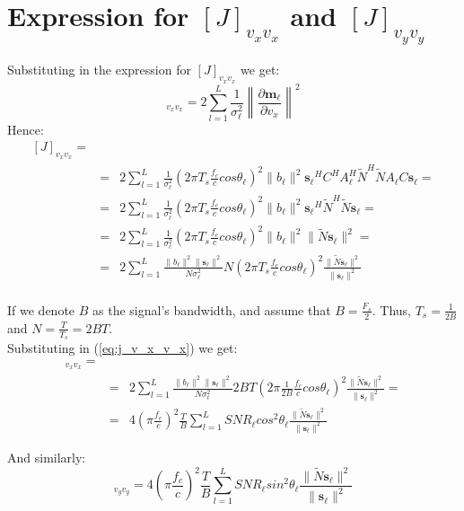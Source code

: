 \section{Expression for $[J]_{v_x v_x}$ and $[J]_{v_y v_y}$ }


Substituting in the expression for $[J]_{v_x v_x}$ we get:
\begin{equation}
[J]_{v_x v_x} = 2\sum_{l=1}^{L}\frac{1}{\sigma_\ell ^2}\left\|\frac{\partial \mathbf{m_\ell }}{\partial v_x}\right\|^2
\end{equation}
Hence:
\begin{eqnarray}
\label{eq:j_v_x_v_x}
[J]_{v_x v_x} = \\
&=& 2\sum_{l=1}^{L}\frac{1}{\sigma_\ell ^2}(2 \pi T_s \frac{f_c}{c}cos\theta_\ell )^2 \|b_\ell \|^2 \mathbf{s_\ell }^H C^H A_\ell ^H \tilde{N}^H  \tilde{N} A_\ell  C \mathbf{s_\ell } = \nonumber \\
&=& 2\sum_{l=1}^{L}\frac{1}{\sigma_\ell ^2}(2 \pi T_s \frac{f_c}{c}cos\theta_\ell )^2 \|b_\ell \|^2 \mathbf{s_\ell }^H \tilde{N}^H  \tilde{N} \mathbf{s_\ell } = \nonumber \\
&=& 2\sum_{l=1}^{L}\frac{1}{\sigma_\ell ^2}(2 \pi T_s \frac{f_c}{c}cos\theta_\ell )^2 \|b_\ell \|^2  \|\tilde{N} \mathbf{s_\ell }\|^2 = \nonumber \\
&=& 2\sum_{l=1}^{L}\frac{\|b_\ell \|^2 \|\mathbf{s_\ell }\|^2}{N \sigma_\ell ^2}N(2 \pi T_s \frac{f_c}{c}cos\theta_\ell )^2  \frac{\|\tilde{N} \mathbf{s_\ell }\|^2}{\|\mathbf{s_\ell }\|^2} \nonumber \\
\end{eqnarray}

If we denote $B$ as the signal's bandwidth, and assume that $B = \frac{F_s}{2}$.
Thus, $T_s = \frac{1}{2B}$ and $N=\frac{T}{T_s}=2BT$.\\
Substituting in (\ref{eq:j_v_x_v_x}) we get:
\begin{eqnarray}
[J]_{v_x v_x} = \\
&=& 2\sum_{l=1}^{L}\frac{\|b_\ell \|^2 \|\mathbf{s_\ell }\|^2}{N \sigma_\ell ^2} 2BT(2 \pi \frac{1}{2B} \frac{f_c}{c}cos\theta_\ell )^2 \frac{\|\tilde{N} \mathbf{s_\ell }\|^2}{\|\mathbf{s_\ell }\|^2} = \nonumber \\
&=&4 \left(\pi \frac{f_c}{c}\right)^2 \frac{T}{B}  \sum_{l=1}^{L}SNR_\ell  cos^2\theta_\ell  \frac{\|\tilde{N} \mathbf{s_\ell }\|^2}{\|\mathbf{s_\ell }\|^2}
\end{eqnarray}

And similarly:
\begin{equation}
[J]_{v_y v_y} =4 \left(\pi \frac{f_c}{c}\right)^2 \frac{T}{B}  \sum_{l=1}^{L}SNR_\ell  sin^2\theta_\ell  \frac{\|\tilde{N} \mathbf{s_\ell }\|^2}{\|\mathbf{s_\ell }\|^2}
\end{equation}


